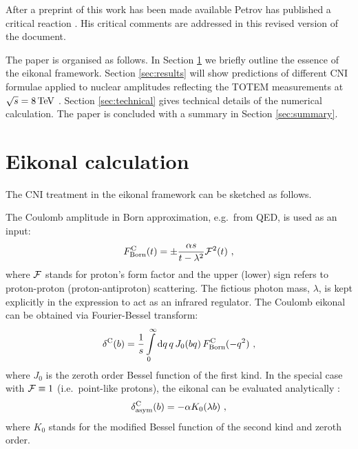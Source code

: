 \documentclass{appolb}
\def\d{{\rm d}}
\def\un#1{\,{\rm #1}}
\def\NEW#1{{#1}}
\begin{document}
\NEW{After a preprint of this work has been made available \cite{preprint} Petrov has published a critical reaction \cite{petrov2020-2}. His critical comments are addressed in this revised version of the document.}

The paper is organised as follows. In Section \ref{sec:eikonal} we briefly outline the essence of the eikonal framework. Section \ref{sec:results} will show predictions of different CNI formulae applied to nuclear amplitudes reflecting the TOTEM measurements at $\sqrt s = 8\un{TeV}$ \cite{totem-8tev-1km}. Section \ref{sec:technical} gives technical details of the numerical calculation. The paper is concluded with a summary in Section \ref{sec:summary}.




\section{Eikonal calculation}
\label{sec:eikonal}

The CNI treatment in the eikonal framework can be sketched as follows.

The Coulomb amplitude in Born approximation, e.g.~from QED, is used as an input:
\begin{equation}
F^{\rm C}_{\rm Born}(t) = \pm {\alpha s\over t - \lambda^2} {\cal F}^2(t)\ ,
\label{eq:F C Born}
\end{equation}
where ${\cal F}$ stands for proton's form factor and the upper (lower) sign refers to proton-proton (proton-antiproton) scattering. The fictious photon mass, $\lambda$, is kept explicitly in the expression to act as an infrared regulator. The Coulomb eikonal can be obtained via Fourier-Bessel transform:
\begin{equation}
\delta^{\rm C}(b) = {1\over s} \int\limits_0^\infty \d q\, q\, J_0(bq)\, F^{\rm C}_{\rm Born}(-q^2)\ ,
\label{eq:de C}
\end{equation}
where $J_0$ is the zeroth order Bessel function of the first kind. In the special case with ${\cal F} \equiv 1$ (i.e.~point-like protons), the eikonal can be evaluated analytically \cite{cahn82}:
\begin{equation}
\delta^{\rm C}_{\rm asym}(b) = -\alpha K_0(\lambda b)\ ,
\label{eq:de C asym}
\end{equation}
where $K_0$ stands for the modified Bessel function of the second kind and zeroth order.
\end{document}

